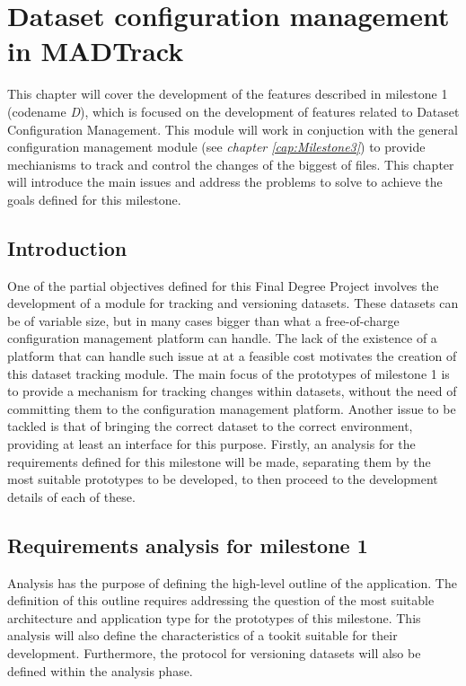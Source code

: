 \chapter{Dataset configuration management in MADTrack}\label{cap:Milestone1}

This chapter will cover the development of the features described in milestone 1 (codename \emph{D}), which is focused on the development of features related to Dataset
Configuration Management. This module will work in conjuction with the general configuration management module (see \emph{chapter \ref{cap:Milestone3}}) to provide mechianisms
to track and control the changes of the biggest of files. This chapter will introduce the main issues and address the problems to solve to achieve the goals defined for this
milestone.

\section{Introduction}

One of the partial objectives defined for this Final Degree Project involves the development of a module for tracking and versioning datasets. These datasets can be of variable
size, but in many cases bigger than what a free-of-charge configuration management platform can handle. The lack of the existence of a platform that can handle such issue at
at a feasible cost motivates the creation of this dataset tracking module. The main focus of the prototypes of milestone 1 is to provide a mechanism for tracking changes within
datasets, without the need of committing them to the configuration management platform. Another issue to be tackled is that of bringing the correct dataset to the correct environment,
providing at least an interface for this purpose. Firstly, an analysis for the requirements defined for this milestone will be made, separating them by the most suitable
prototypes to be developed, to then proceed to the development details of each of these.

\section{Requirements analysis for milestone 1}

Analysis has the purpose of defining the high-level outline of the application. The definition of this outline requires addressing the question of the most suitable architecture and
application type for the prototypes of this milestone. This analysis will also define the characteristics of a tookit suitable for their development. Furthermore, the
protocol for versioning datasets will also be defined within the analysis phase.

